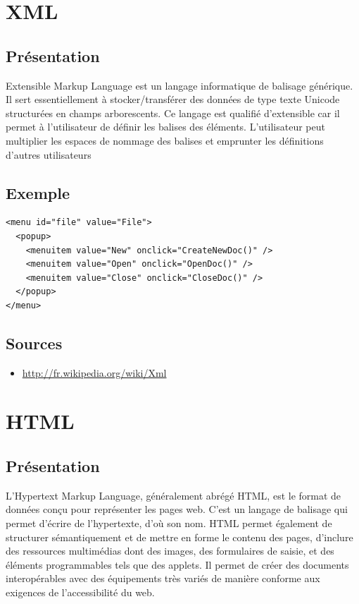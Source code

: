 \documentclass[a4paper,10pt]{report}
\begin{document}
  \section{XML}

    \subsection{Présentation}

Extensible Markup Language est un langage informatique de balisage générique. 
Il sert essentiellement à stocker/transférer des données de type texte Unicode 
structurées en champs arborescents. Ce langage est qualifié d’extensible car 
il permet à l'utilisateur de définir les balises des éléments. L'utilisateur 
peut multiplier les espaces de nommage des balises et emprunter les définitions 
d'autres utilisateurs

    \subsection{Exemple}

\begin{verbatim}
<menu id="file" value="File">
  <popup>
    <menuitem value="New" onclick="CreateNewDoc()" />
    <menuitem value="Open" onclick="OpenDoc()" />
    <menuitem value="Close" onclick="CloseDoc()" />
  </popup>
</menu>
\end{verbatim} 

    \subsection{Sources}

\begin{itemize}
 \item \url{http://fr.wikipedia.org/wiki/Xml}
\end{itemize}


  \section{HTML}

    \subsection{Présentation}

L’Hypertext Markup Language, généralement abrégé HTML, est le format de données 
conçu pour représenter les pages web. C’est un langage de balisage qui permet 
d’écrire de l’hypertexte, d’où son nom. HTML permet également de structurer 
sémantiquement et de mettre en forme le contenu des pages, d’inclure des 
ressources multimédias dont des images, des formulaires de saisie, et des 
éléments programmables tels que des applets. Il permet de créer des documents 
interopérables avec des équipements très variés de manière conforme aux exigences 
de l’accessibilité du web.
\end{document}
